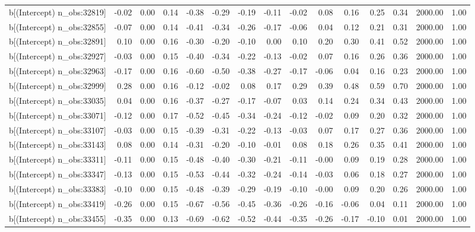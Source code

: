 \begin{table}[ht]
\begin{tabular}{rrrrrrrrrrrrrrr}
  b[(Intercept) n\_obs:32819] & -0.02 & 0.00 & 0.14 & -0.38 & -0.29 & -0.19 & -0.11 & -0.02 & 0.08 & 0.16 & 0.25 & 0.34 & 2000.00 & 1.00 \\ 
  b[(Intercept) n\_obs:32855] & -0.07 & 0.00 & 0.14 & -0.41 & -0.34 & -0.26 & -0.17 & -0.06 & 0.04 & 0.12 & 0.21 & 0.31 & 2000.00 & 1.00 \\ 
  b[(Intercept) n\_obs:32891] & 0.10 & 0.00 & 0.16 & -0.30 & -0.20 & -0.10 & 0.00 & 0.10 & 0.20 & 0.30 & 0.41 & 0.52 & 2000.00 & 1.00 \\ 
  b[(Intercept) n\_obs:32927] & -0.03 & 0.00 & 0.15 & -0.40 & -0.34 & -0.22 & -0.13 & -0.02 & 0.07 & 0.16 & 0.26 & 0.36 & 2000.00 & 1.00 \\ 
  b[(Intercept) n\_obs:32963] & -0.17 & 0.00 & 0.16 & -0.60 & -0.50 & -0.38 & -0.27 & -0.17 & -0.06 & 0.04 & 0.16 & 0.23 & 2000.00 & 1.00 \\ 
  b[(Intercept) n\_obs:32999] & 0.28 & 0.00 & 0.16 & -0.12 & -0.02 & 0.08 & 0.17 & 0.29 & 0.39 & 0.48 & 0.59 & 0.70 & 2000.00 & 1.00 \\ 
  b[(Intercept) n\_obs:33035] & 0.04 & 0.00 & 0.16 & -0.37 & -0.27 & -0.17 & -0.07 & 0.03 & 0.14 & 0.24 & 0.34 & 0.43 & 2000.00 & 1.00 \\ 
  b[(Intercept) n\_obs:33071] & -0.12 & 0.00 & 0.17 & -0.52 & -0.45 & -0.34 & -0.24 & -0.12 & -0.02 & 0.09 & 0.20 & 0.32 & 2000.00 & 1.00 \\ 
  b[(Intercept) n\_obs:33107] & -0.03 & 0.00 & 0.15 & -0.39 & -0.31 & -0.22 & -0.13 & -0.03 & 0.07 & 0.17 & 0.27 & 0.36 & 2000.00 & 1.00 \\ 
  b[(Intercept) n\_obs:33143] & 0.08 & 0.00 & 0.14 & -0.31 & -0.20 & -0.10 & -0.01 & 0.08 & 0.18 & 0.26 & 0.35 & 0.41 & 2000.00 & 1.00 \\ 
  b[(Intercept) n\_obs:33311] & -0.11 & 0.00 & 0.15 & -0.48 & -0.40 & -0.30 & -0.21 & -0.11 & -0.00 & 0.09 & 0.19 & 0.28 & 2000.00 & 1.00 \\ 
  b[(Intercept) n\_obs:33347] & -0.13 & 0.00 & 0.15 & -0.53 & -0.44 & -0.32 & -0.24 & -0.14 & -0.03 & 0.06 & 0.18 & 0.27 & 2000.00 & 1.00 \\ 
  b[(Intercept) n\_obs:33383] & -0.10 & 0.00 & 0.15 & -0.48 & -0.39 & -0.29 & -0.19 & -0.10 & -0.00 & 0.09 & 0.20 & 0.26 & 2000.00 & 1.00 \\ 
  b[(Intercept) n\_obs:33419] & -0.26 & 0.00 & 0.15 & -0.67 & -0.56 & -0.45 & -0.36 & -0.26 & -0.16 & -0.06 & 0.04 & 0.11 & 2000.00 & 1.00 \\ 
  b[(Intercept) n\_obs:33455] & -0.35 & 0.00 & 0.13 & -0.69 & -0.62 & -0.52 & -0.44 & -0.35 & -0.26 & -0.17 & -0.10 & 0.01 & 2000.00 & 1.00 \\ 

\end{tabular}
\end{table}

